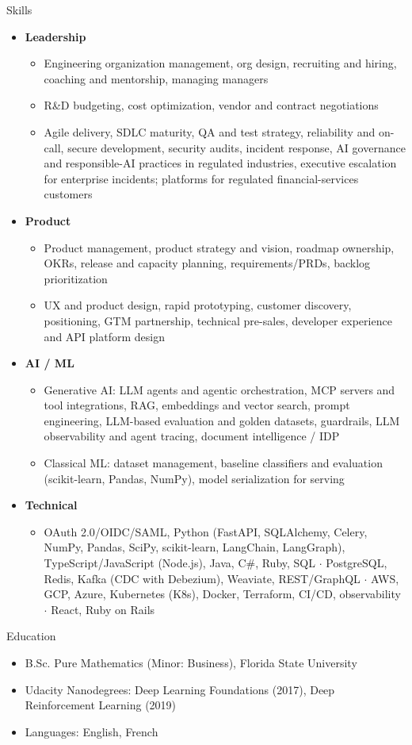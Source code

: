\documentclass[10pt,oneside]{article}
\newenvironment{ressection}[1]{
  \vspace{4pt}
  {\fontfamily{phv}\selectfont\Large#1}
  \begin{itemize}
    \vspace{3pt}
}{
  \end{itemize}
}
\newcommand{\resitem}[1]{
  \vspace{-4pt}
\item \begin{flushleft} #1 \end{flushleft}
}
\newcommand{\ressubitem}[1]{
  \vspace{-1pt}
\item \begin{flushleft} #1 \end{flushleft}
}
\newenvironment{reslist}[1]{
  \resitem{\textbf{#1}}
  \vspace{-5pt}
  \begin{itemize}
}{
  \end{itemize}
}
\begin{document}
\begin{ressection}{Skills}
  \begin{reslist}{Leadership}
    \ressubitem{Engineering organization management, org design, recruiting and hiring, coaching and mentorship, managing managers}
    \ressubitem{R\&D budgeting, cost optimization, vendor and contract negotiations}
    \ressubitem{Agile delivery, SDLC maturity, QA and test strategy, reliability and on-call, secure development, security audits, incident response, AI governance and responsible-AI practices in regulated industries, executive escalation for enterprise incidents; platforms for regulated financial-services customers}
  \end{reslist}
  \begin{reslist}{Product}
    \ressubitem{Product management, product strategy and vision, roadmap ownership, OKRs, release and capacity planning, requirements/PRDs, backlog prioritization}
    \ressubitem{UX and product design, rapid prototyping, customer discovery, positioning, GTM partnership, technical pre-sales, developer experience and API platform design}
  \end{reslist}
  \begin{reslist}{AI / ML}
    \ressubitem{Generative AI: LLM agents and agentic orchestration, MCP servers and tool integrations, RAG, embeddings and vector search, prompt engineering, LLM-based evaluation and golden datasets, guardrails, LLM observability and agent tracing, document intelligence / IDP}
    \ressubitem{Classical ML: dataset management, baseline classifiers and evaluation (scikit-learn, Pandas, NumPy), model serialization for serving}
  \end{reslist}
  \begin{reslist}{Technical}
    \ressubitem{OAuth 2.0/OIDC/SAML, Python (FastAPI, SQLAlchemy, Celery, NumPy, Pandas, SciPy, scikit-learn, LangChain, LangGraph), TypeScript/JavaScript (Node.js), Java, C\#, Ruby, SQL $\cdot$ PostgreSQL, Redis, Kafka (CDC with Debezium), Weaviate, REST/GraphQL $\cdot$ AWS, GCP, Azure, Kubernetes (K8s), Docker, Terraform, CI/CD, observability $\cdot$ React, Ruby on Rails}
  \end{reslist}
\end{ressection}

\begin{ressection}{Education}
  \ressubitem{B.Sc. Pure Mathematics (Minor: Business), Florida State University}
  \ressubitem{Udacity Nanodegrees: Deep Learning Foundations (2017), Deep Reinforcement Learning (2019)}
  \ressubitem{Languages: English, French}
\end{ressection}
\end{document}
